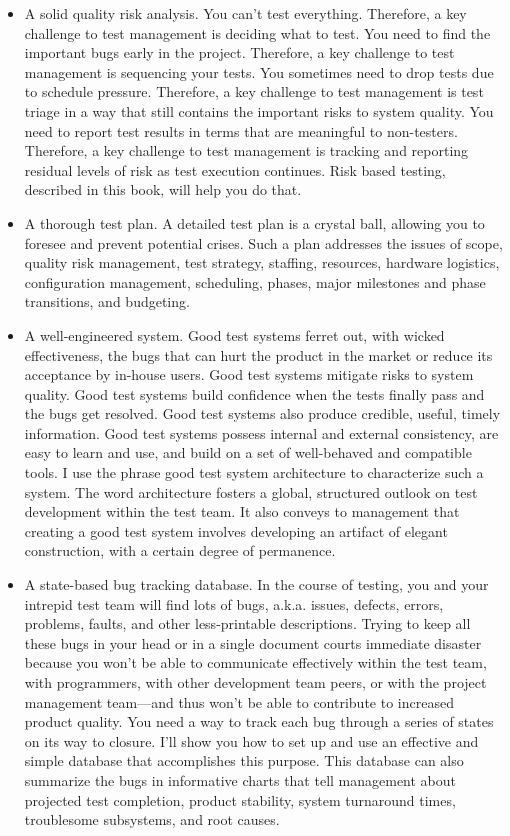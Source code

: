 \begin{itemize}
    \item A solid quality risk analysis. You can't test everything. Therefore, a key challenge to test management is deciding what to test. You need to find the important bugs early in the project. Therefore, a key challenge to test management is sequencing your tests. You sometimes need to drop tests due to schedule pressure. Therefore, a key challenge to test management is test triage in a way that still contains the important risks to system quality. You need to report test results in terms that are meaningful to non-testers. Therefore, a key challenge to test management is tracking and reporting residual levels of risk as test execution continues. Risk based testing, described in this book, will help you do that.

    \item A thorough test plan. A detailed test plan is a crystal ball, allowing you to foresee and prevent potential crises. Such a plan addresses the issues of scope, quality risk management, test strategy, staffing, resources, hardware logistics, configuration management, scheduling, phases, major milestones and phase transitions, and budgeting.

    \item A well-engineered system. Good test systems ferret out, with wicked effectiveness, the bugs that can hurt the product in the market or reduce its acceptance by in-house users. Good test systems mitigate risks to system quality. Good test systems build confidence when the tests finally pass and the bugs get resolved. Good test systems also produce credible, useful, timely information. Good test systems possess internal and external consistency, are easy to learn and use, and build on a set of well-behaved and compatible tools. I use the phrase good test system architecture to characterize such a system. The word architecture fosters a global, structured outlook on test development within the test team. It also conveys to management that creating a good test system involves developing an artifact of elegant construction, with a certain degree of permanence.

    \item A state-based bug tracking database. In the course of testing, you and your intrepid test team will find lots of bugs, a.k.a. issues, defects, errors, problems, faults, and other less-printable descriptions. Trying to keep all these bugs in your head or in a single document courts immediate disaster because you won't be able to communicate effectively within the test team, with programmers, with other development team peers, or with the project management team—and thus won't be able to contribute to increased product quality. You need a way to track each bug through a series of states on its way to closure. I'll show you how to set up and use an effective and simple database that accomplishes this purpose. This database can also summarize the bugs in informative charts that tell management about projected test completion, product stability, system turnaround times, troublesome subsystems, and root causes.


\end{itemize}
